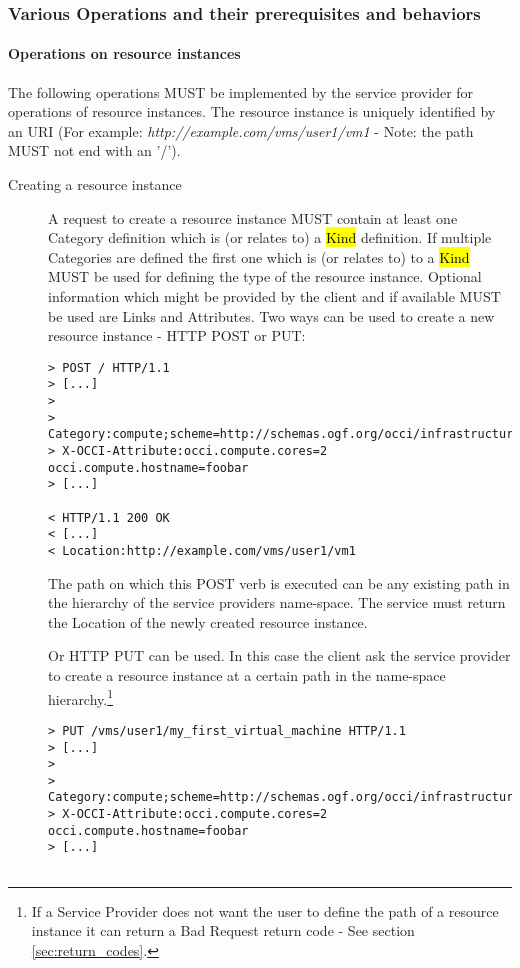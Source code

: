 \documentclass[10pt,a4paper]{article}
\begin{document}
\subsubsection{Various Operations and their prerequisites and behaviors}

\paragraph{Operations on resource instances}
The following operations MUST be implemented by the service provider
for operations of resource instances. The resource instance is
uniquely identified by an URI (For example:
\emph{http://example.com/vms/user1/vm1} - Note: the path MUST not end
with an '/').

\begin{description}
\item[Creating a resource instance] A request to create a resource
  instance MUST contain at least one Category definition which is (or
  relates to) a \hl{Kind} definition. If multiple Categories are
  defined the first one which is (or relates to) to a \hl{Kind} MUST
  be used for defining the type of the resource instance. Optional
  information which might be provided by the client and if available
  MUST be used are Links and Attributes. Two ways can be used to
  create a new resource instance - HTTP POST or PUT:
\begin{verbatim}
> POST / HTTP/1.1
> [...]
> 
> Category:compute;scheme=http://schemas.ogf.org/occi/infrastructure
> X-OCCI-Attribute:occi.compute.cores=2 occi.compute.hostname=foobar
> [...]
 
< HTTP/1.1 200 OK
< [...]
< Location:http://example.com/vms/user1/vm1
\end{verbatim}
  The path on which this POST verb is executed can be any existing
  path in the hierarchy of the service providers name-space. The
  service must return the Location of the newly created resource
  instance.

  Or HTTP PUT can be used. In this case the client ask the service
  provider to create a resource instance at a certain path in the
  name-space hierarchy.\footnote{If a Service Provider does not want the
    user to define the path of a resource instance it can return a Bad
    Request return code - See section \ref{sec:return_codes}.}
\begin{verbatim}
> PUT /vms/user1/my_first_virtual_machine HTTP/1.1
> [...]
> 
> Category:compute;scheme=http://schemas.ogf.org/occi/infrastructure
> X-OCCI-Attribute:occi.compute.cores=2 occi.compute.hostname=foobar
> [...]
 

\end{verbatim}
\end{description}
\end{document}
